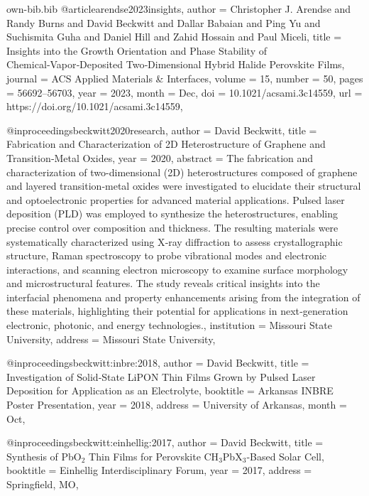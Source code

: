 \begin{filecontents*}{own-bib.bib}
@article{arendse2023insights,
  author  = {Christopher J. Arendse and Randy Burns and David Beckwitt and Dallar Babaian and Ping Yu and Suchismita Guha and Daniel Hill and Zahid Hossain and Paul Miceli},
  title   = {{Insights into the Growth Orientation and Phase Stability of {Chemical‑Vapor‑Deposited} {Two‑Dimensional} Hybrid Halide Perovskite Films}},
  journal = {ACS Applied Materials \& Interfaces},
  volume  = {15},
  number  = {50},
  pages   = {56692--56703},
  year    = {2023},
  month   = {Dec},
  doi     = {10.1021/acsami.3c14559},
  url     = {https://doi.org/10.1021/acsami.3c14559},
}

@inproceedings{beckwitt2020research,
  author      = {David Beckwitt},
  title       = {{Fabrication and Characterization of {2D} Heterostructure of {Graphene} and {Transition‑Metal Oxides}}},
  year        = {2020},
  abstract    = {The fabrication and characterization of two-dimensional (2D) heterostructures composed of graphene and layered transition‑metal oxides were investigated to elucidate their structural and optoelectronic properties for advanced material applications. Pulsed laser deposition (PLD) was employed to synthesize the heterostructures, enabling precise control over composition and thickness. The resulting materials were systematically characterized using X‑ray diffraction to assess crystallographic structure, Raman spectroscopy to probe vibrational modes and electronic interactions, and scanning electron microscopy to examine surface morphology and microstructural features. The study reveals critical insights into the interfacial phenomena and property enhancements arising from the integration of these materials, highlighting their potential for applications in next‑generation electronic, photonic, and energy technologies.},
  institution  = {Missouri State University},
  address      = {Missouri State University},
}

@inproceedings{beckwitt:inbre:2018,
  author    = {David Beckwitt},
  title     = {{Investigation of Solid‑State {LiPON} Thin Films Grown by {Pulsed Laser Deposition} for Application as an Electrolyte}},
  booktitle = {Arkansas {INBRE} Poster Presentation},
  year      = {2018},
  address   = {University of Arkansas},
  month     = {Oct},
}

@inproceedings{beckwitt:einhellig:2017,
  author    = {David Beckwitt},
  title     = {{Synthesis of {PbO}$_2$ Thin Films for Perovskite {CH}$_3${PbX}$_3$‑Based Solar Cell}},
  booktitle = {Einhellig Interdisciplinary Forum},
  year      = {2017},
  address   = {Springfield, MO},
}


\end{filecontents*}
